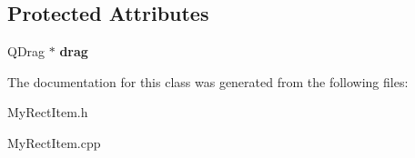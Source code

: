 \subsection*{Protected Attributes}
\begin{DoxyCompactItemize}
\item 
\hypertarget{class_my_rect_item_a9d38187add8c23b7de77e8870293833b}{}Q\+Drag $\ast$ {\bfseries drag}\label{class_my_rect_item_a9d38187add8c23b7de77e8870293833b}

\end{DoxyCompactItemize}


The documentation for this class was generated from the following files\+:\begin{DoxyCompactItemize}
\item 
My\+Rect\+Item.\+h\item 
My\+Rect\+Item.\+cpp\end{DoxyCompactItemize}
